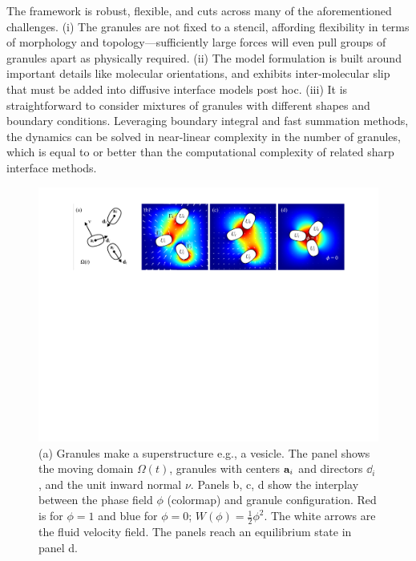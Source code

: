 The framework is robust, flexible, and
cuts across many of the aforementioned challenges.
(i) The granules are not fixed to a stencil, 
affording flexibility in terms of morphology and topology---sufficiently
large forces will even pull groups of granules apart as physically required.
(ii) The model formulation is built around important details like molecular orientations,
and exhibits inter-molecular slip that must be added into diffusive interface models
post hoc. 
(iii) It is straightforward to consider mixtures of granules with different
shapes and boundary conditions.
Leveraging boundary integral and fast summation methods, the dynamics can be solved in 
near-linear complexity in the number of granules,
which is equal to or better than 
the computational complexity of related sharp interface methods. 

\begin{figure}
  \begin{center}
    \includegraphics[width=\textwidth]{figures/Background/Domain.pdf}
  \end{center}
  \caption{\label{fig:flow_map} \footnotesize
  (a) Granules make a superstructure e.g., a vesicle. The panel shows
  the moving domain $\Omega(t)$, granules with centers $\aa_i$ and directors $\dd_i$,
  and the unit inward normal $\nu.$ Panels b, c, d show the
  interplay between the phase field $\phi$ (colormap) and granule configuration.
  Red is for $\phi = 1$ and blue for $\phi = 0$; $W(\phi) = \tfrac{1}{2}\phi^2$.
  The white arrows are the fluid velocity field.
  The panels reach an equilibrium state in panel d.
  }
\end{figure}

